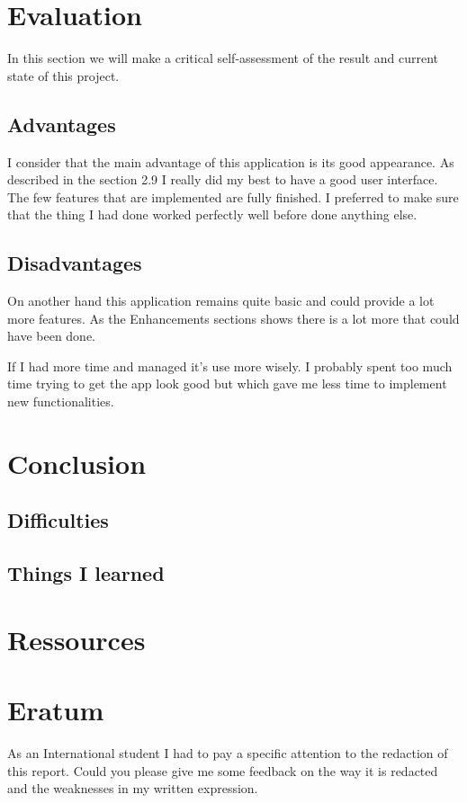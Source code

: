 \documentclass[10pt, a4paper]{article}
\begin{document}
	\section{Evaluation}
	In this section we will make a critical self-assessment of the result and current state of this project. 
	
	\subsection{Advantages} %
	I consider that the main advantage of this application is its good appearance. As described in the section 2.9 I really did my best to have a good user interface. The few features that are implemented are fully finished. I preferred to make sure that the thing I had done worked perfectly well before done anything else.
	
	\subsection{Disadvantages} %
	On another hand this application remains quite basic and could provide a lot more features. As the Enhancements sections shows there is a lot more that could have been done.
	
	If I had more time and managed it's use more wisely. I probably spent too much time trying to get the app look good but which gave me less time to implement new functionalities.
	
	

	\section{Conclusion} 
	\subsection{Difficulties}  %
	
	\subsection{Things I learned}  %
	
	\section{Ressources}  %
	
	\section{Eratum}
	As an International student I had to pay a specific attention to the redaction of this report. Could you please give me some feedback on the way it is redacted and the weaknesses in my written expression.
		
\end{document}
